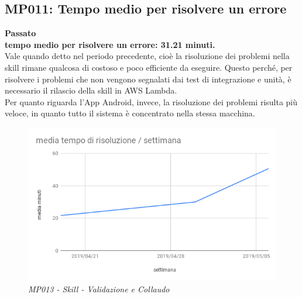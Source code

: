 \subsection{MP011: Tempo medio per risolvere un errore} 
\textbf{Passato}\\
\textbf{tempo medio per risolvere un errore: 31.21 minuti.}\\
Vale quando detto nel periodo precedente, cioè la risoluzione dei problemi nella skill rimane qualcosa di costoso e poco efficiente da eseguire. Questo perché, per risolvere i problemi che non vengono segnalati dai test di integrazione e unità, è necessario il rilascio della skill in AWS Lambda.\\
Per quanto riguarda l'App Android, invece, la risoluzione dei problemi risulta più veloce, in quanto tutto il sistema è concentrato nella stessa macchina.
\begin{figure} [H]
    \centering
	\includegraphics[scale=0.5]{./images/RA_errori.png}
    \caption{\textit{MP013 - Skill - Validazione e Collaudo}}\label{}
\end{figure}

